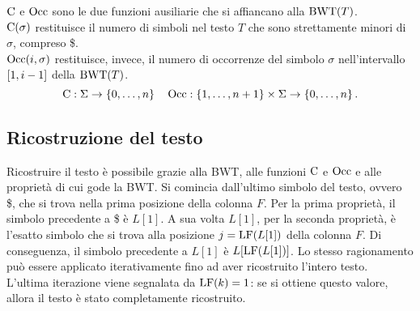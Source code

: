 $\textnormal{C}$ e $\textnormal{Occ}$ sono le due funzioni ausiliarie che si affiancano alla
$\textnormal{BWT}(T)$.\\
$\textnormal{C}(\sigma)$ restituisce il numero di simboli nel testo $T$ che sono
strettamente minori di $\sigma$, compreso \$.\\
$\textnormal{Occ} (i, \sigma)$ restituisce, invece, il numero di occorrenze del simbolo
$\sigma$ nell'intervallo $\left[1, i-1\right]$ della $\textnormal{BWT}(T)$.
\[
    \textnormal{C}: \Sigma \rightarrow \left\{0, \ldots, n\right\} \quad
    \textnormal{Occ}: \left\{1, \ldots, n+1\right\} \times \Sigma \rightarrow \left\{0, \ldots, n\right\}.
\]

\subsection*{Ricostruzione del testo}
Ricostruire il testo è possibile grazie alla BWT, alle funzioni $\textnormal{C}$ e
$\textnormal{Occ}$ e alle proprietà di cui gode la BWT.
Si comincia dall'ultimo simbolo del testo, ovvero \$, che si trova nella prima
posizione della colonna $F$.
Per la prima proprietà, il simbolo precedente a \$ è $L[1]$.
A sua volta $L[1]$, per la seconda proprietà, è l'esatto simbolo che si trova
alla posizione $j = \textnormal{LF}(L[1])$ della colonna $F$. Di conseguenza, il simbolo
precedente a $L[1]$ è $L[\textnormal{LF}(L[1])]$.
Lo stesso ragionamento può essere applicato iterativamente fino ad aver
ricostruito l'intero testo.\\
L'ultima iterazione viene segnalata da $\textnormal{LF}(k) = 1$: se si ottiene questo
valore, allora il testo è stato completamente ricostruito.

